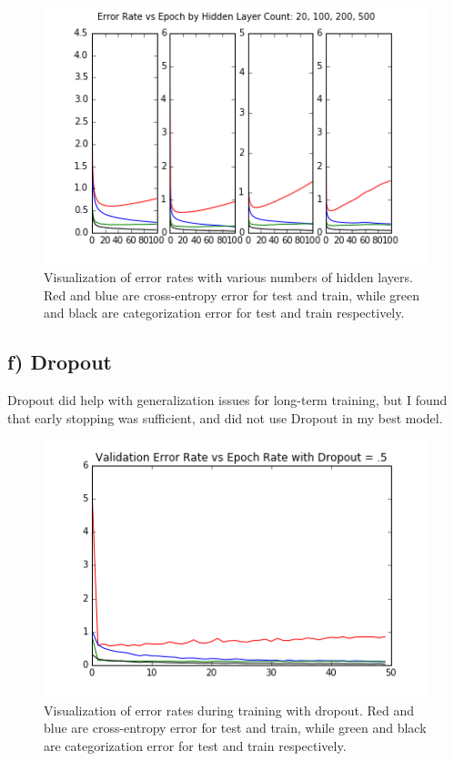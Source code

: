 \documentclass{article}
\begin{document}
\begin{figure}[h]
  \centering
  \includegraphics[scale=0.6]{../hidden_units.png} 
  \caption{Visualization of error rates with various numbers of hidden layers. Red and blue are cross-entropy error for test and train, while green and black are categorization error for test and train respectively. }
  \label{fig:hiddenunits}
\end{figure}

\subsection{f) Dropout}

Dropout did help with generalization issues for long-term training, but I found that early stopping was sufficient, and did not use Dropout in my best model.

\begin{figure}[h]
  \centering
  \includegraphics[scale=0.6]{../dropout1.png} 
  \caption{Visualization of error rates during training with dropout. Red and blue are cross-entropy error for test and train, while green and black are categorization error for test and train respectively. }
  \label{fig:momentumsrate1}
\end{figure}
\end{document}
